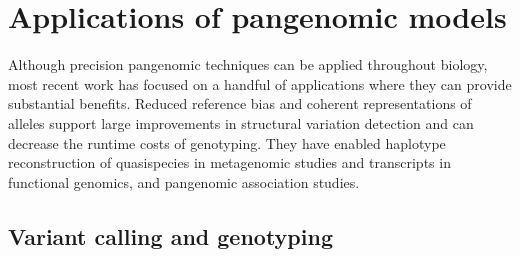 \section{Applications of pangenomic models}

Although precision pangenomic techniques can be applied throughout biology, most recent work has focused on a handful of applications where they can provide substantial benefits.
Reduced reference bias and coherent representations of alleles support large improvements in structural variation detection and can decrease the runtime costs of genotyping.
They have enabled haplotype reconstruction of quasispecies in metagenomic studies and transcripts in functional genomics, and pangenomic association studies.



\subsection{Variant calling and genotyping}


